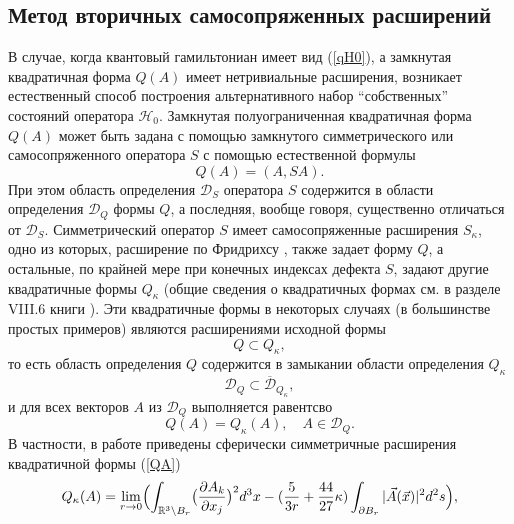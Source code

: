 \documentclass[12pt]{article}
\newcommand{\ol}{\overline}
\newcommand{\DD}{\mathcal{D}}
\newcommand{\HH}{\mathscr{H}}
\newcommand{\RR}{\mathbb{R}}
\begin{document}
\subsection{Метод вторичных самосопряженных расширений}
    В случае, когда квантовый гамильтониан имеет вид
(\ref{qH0}),
    а замкнутая квадратичная форма
$ Q(A) $
    имеет нетривиальные расширения, возникает естественный способ
    построения альтернативного набор ``собственных'' состояний оператора
$ \HH_{0} $.
    Замкнутая полуограниченная квадратичная форма
$ Q(A) $
    может быть задана с помощью замкнутого симметрического или самосопряженного
    оператора
$ S $
    с помощью естественной формулы
\begin{equation*}
    Q(A) = (A,SA) .
\end{equation*}
    При этом область определения 
$ \DD_{S} $
    оператора
$ S $
    содержится в области определения 
$ \DD_{Q} $
    формы
$ Q $,
    а последняя, вообще говоря, существенно отличаться от
$ \DD_{S} $.
    Симметрический оператор
$ S $
    имеет самосопряженные расширения
$ S_{\kappa} $,
    одно из которых, расширение по Фридрихсу
\cite{FStone},
    также задает форму
$ Q $,
    а остальные, по крайней мере при конечных индексах дефекта
$ S $,
    задают другие квадратичные формы
$ Q_{\kappa} $
(общие сведения о квадратичных формах см. в разделе VIII.6 книги
\cite{RS1}).
    Эти квадратичные формы в некоторых случаях (в большинстве простых примеров)
    являются расширениями исходной формы
\begin{equation*}
    Q \subset Q_{\kappa} ,
\end{equation*}
    то есть область определения
$ Q $
    содержится в замыкании области определения
$ Q_{\kappa} $
\begin{equation*}
    \DD_{Q} \subset \ol{\DD}_{Q_{\kappa}} ,
\end{equation*}
    и для всех векторов
$ A $ из
$ \DD_{Q} $
    выполняется равентсво
\begin{equation*}
    Q(A) = Q_{\kappa}(A) ,\quad A\in \DD_{Q}.
\end{equation*}
    В частности, в работе
\cite{Inv}
    приведены сферически симметричные расширения квадратичной формы
(\ref{QA})
\begin{equation}
\label{QkA}
        Q_{\kappa}(A) = \lim_{r\to 0}\Bigl(
    \int_{\RR^{3}\setminus B_{r}}
        \bigl(\frac{\partial A_{k}}{\partial x_{j}}\bigr)^{2} d^{3} x -
    (\frac{5}{3r}+ \frac{44}{27}\kappa) \int_{\partial B_{r}}
        |\vec{A}(\vec{x})|^{2} d^{2} s \Bigr) ,
\end{equation}
\end{document}
